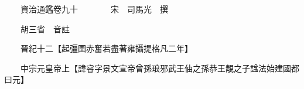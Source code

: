 










 


 
 


 

  
  
  
  
  





  
  
  
  
  
 
  

  

  
  
  



  

 
 

  
   




  

  
  


  　　資治通鑑卷九十　　　　宋　司馬光　撰

　　胡三省　音註

　　晉紀十二【起彊圉赤奮若盡著雍攝提格凡二年】

　　中宗元皇帝上【諱睿字景文宣帝曾孫琅邪武王伷之孫恭王靚之子諡法始建國都曰元】

